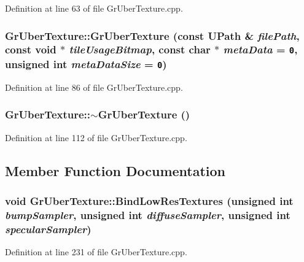 \begin{CompactItemize}
Definition at line 63 of file GrUberTexture.cpp.\hypertarget{class_gr_uber_texture_0e23ddce6edf3799c7f6674609f69161}{
\subsubsection[{GrUberTexture}]{\setlength{\rightskip}{0pt plus 5cm}GrUberTexture::GrUberTexture (const {\bf UPath} \& {\em filePath}, \/  const void $\ast$ {\em tileUsageBitmap}, \/  const char $\ast$ {\em metaData} = {\tt 0}, \/  unsigned int {\em metaDataSize} = {\tt 0})}}
\label{class_gr_uber_texture_0e23ddce6edf3799c7f6674609f69161}




Definition at line 86 of file GrUberTexture.cpp.\hypertarget{class_gr_uber_texture_56e4aea92ddd87bcf5b87915a6673513}{
\subsubsection[{$\sim$GrUberTexture}]{\setlength{\rightskip}{0pt plus 5cm}GrUberTexture::$\sim$GrUberTexture ()}}
\label{class_gr_uber_texture_56e4aea92ddd87bcf5b87915a6673513}




Definition at line 112 of file GrUberTexture.cpp.

\subsection{Member Function Documentation}
\hypertarget{class_gr_uber_texture_13ff60984b63487fa9532e0668acafbb}{
\subsubsection[{BindLowResTextures}]{\setlength{\rightskip}{0pt plus 5cm}void GrUberTexture::BindLowResTextures (unsigned int {\em bumpSampler}, \/  unsigned int {\em diffuseSampler}, \/  unsigned int {\em specularSampler})}}
\label{class_gr_uber_texture_13ff60984b63487fa9532e0668acafbb}




Definition at line 231 of file GrUberTexture.cpp.\hypertarget{class_gr_uber_texture_066a12f3119df39f9d3ba6140f41f419}{
}
\end{CompactItemize}
